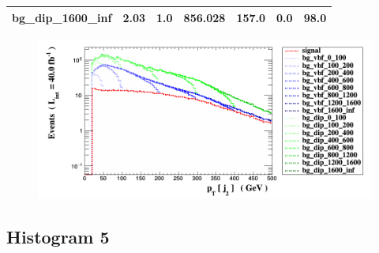 \documentclass[a4paper, 10pt]{article}
\begin{document}
\begin{table}[H]
\begin{center}
\begin{tabular}{|m{23.0mm}|m{23.0mm}|m{18.0mm}|m{19.0mm}|m{19.0mm}|m{19.0mm}|m{19.0mm}|}
      \hline
      {\cellcolor{white}         bg\_dip\_1600\_inf}& {\cellcolor{white}         2.03}& {\cellcolor{white}         1.0}& {\cellcolor{white}         856.028}& {\cellcolor{white}         157.0}& {\cellcolor{red}         0.0}& {\cellcolor{red}         98.0}\\
\hline
    \end{tabular}
  \end{center}
\end{table}

\begin{figure}[H]
  \begin{center}
    \includegraphics[scale=0.45]{selection_3.png}\\
\caption{   }
  \end{center}
\end{figure}
      \newpage
\subsection{ Histogram 5}
\end{document}
